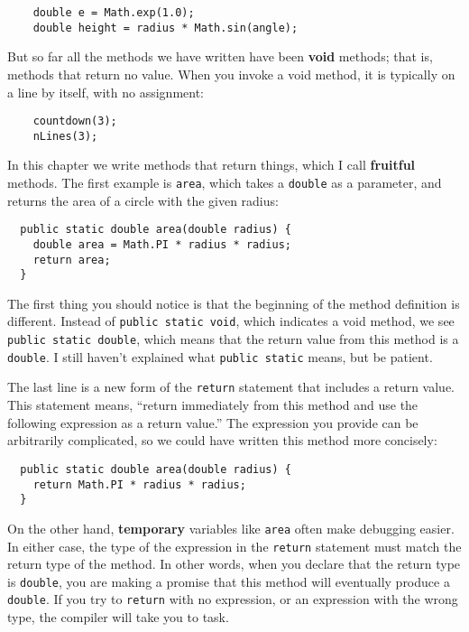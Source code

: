 \documentclass{book}
\begin{document}
\begin{verbatim}
    double e = Math.exp(1.0);
    double height = radius * Math.sin(angle);
\end{verbatim}
%
But so far all the methods we have written have been {\bf void}
methods; that is, methods that return no value.  When you invoke
a void method, it is typically on a line by itself, with
no assignment:

\begin{verbatim}
    countdown(3);
    nLines(3);
\end{verbatim}
%
In this chapter we write methods that return things, which I call 
{\bf fruitful} methods.  The first example is {\tt area}, which takes a
{\tt double} as a parameter, and returns the area of a circle with the
given radius:

\begin{verbatim}
  public static double area(double radius) {
    double area = Math.PI * radius * radius;
    return area;
  }
\end{verbatim}
%
The first thing you should notice is that the beginning of the
method definition is different.  Instead of {\tt public static
void}, which indicates a void method, we see {\tt public static
double}, which means that the return value from this method
is a {\tt double}.  I still haven't explained what
{\tt public static} means, but be patient.


The last line is a new form of the
{\tt return} statement that includes a return value.  This
statement means, ``return immediately from this method and
use the following expression as a return value.''  The
expression you provide can be arbitrarily complicated,
so we could have written this method more concisely:

\begin{verbatim}
  public static double area(double radius) {
    return Math.PI * radius * radius;
  }
\end{verbatim}
%
On the other hand, {\bf temporary} variables like {\tt area} often
make debugging easier.  In either case, the type of the expression in
the {\tt return} statement must match the return type of the method.
In other words, when you declare that the return type is {\tt double},
you are making a promise that this method will eventually
produce a {\tt double}.  If you try to {\tt return} with no
expression, or an expression with the wrong type, the compiler will
take you to task.

\end{document}
